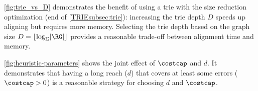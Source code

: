\cref{fig:trie_vs_D} demonstrates the benefit of using a trie with the size
reduction optimization (end of \cref{TRIEsubsec:trie}): increasing the trie depth
$D$ speeds up aligning but requires more memory. Selecting the trie depth based
on the graph size \mbox{$D = \lfloor \log_\Sigma \lvert \RG \rvert \rfloor$}
provides a reasonable trade-off between alignment time and memory.

\cref{fig:heuristic-parameters} shows the joint effect of $\costcap$ and $d$. It
demonstrates that having a long reach ($d$) that covers at least some errors
($\costcap > 0$) is a reasonable strategy for choosing $d$ and $\costcap$.